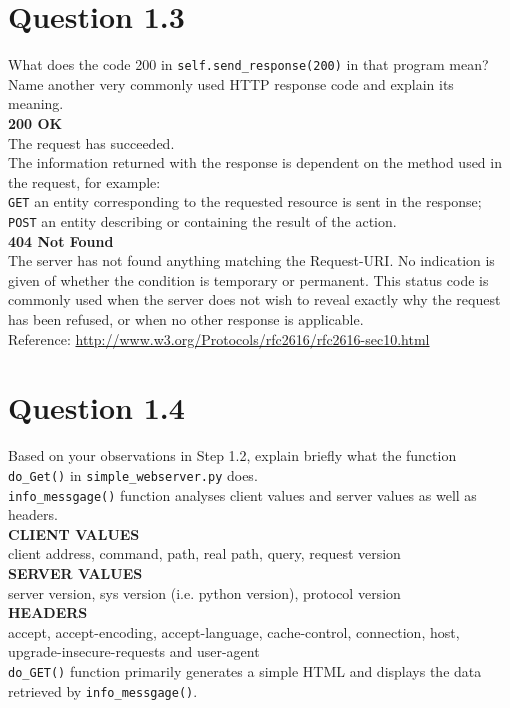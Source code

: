 \documentclass{article}
\newenvironment{homeworkProblem}[1]{
	\section*{#1}
	}{
}
\begin{document}
\begin{homeworkProblem}{Question 1.3}
What does the code 200 in \texttt{self.send\_response(200)} in that program mean? Name another very commonly used HTTP response code and explain its meaning.\\

\textbf{200 OK}\\
The request has succeeded.\\

The information returned with the response is dependent on the method used in the request, for example:\\
\texttt{GET} an entity corresponding to the requested resource is sent in the response;\\
\texttt{POST} an entity describing or containing the result of the action.\\

\textbf{404 Not Found}\\
The server has not found anything matching the Request-URI. No indication is given of whether the condition is temporary or permanent. This status code is commonly used when the server does not wish to reveal exactly why the request has been refused, or when no other response is applicable.\\

Reference: \url{http://www.w3.org/Protocols/rfc2616/rfc2616-sec10.html}
\end{homeworkProblem}


\begin{homeworkProblem}{Question 1.4}
Based on your observations in Step 1.2, explain briefly what the function \texttt{do\_Get()} in \texttt{simple\_webserver.py} does.\\

\texttt{info\_messgage()} function analyses client values and server values as well as headers.\\

\textbf{CLIENT VALUES}\\
client address, command, path, real path, query, request version\\

\textbf{SERVER VALUES}\\
server version, sys version (i.e. python version), protocol version\\

\textbf{HEADERS}\\
accept, accept-encoding, accept-language, cache-control, connection, host, upgrade-insecure-requests and user-agent\\

\texttt{do\_GET()} function primarily generates a simple HTML and displays the data retrieved by \texttt{info\_messgage()}.
\end{homeworkProblem}
\end{document}

